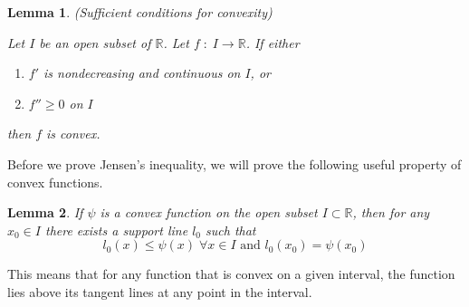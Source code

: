 \documentclass{article}
\newtheorem*{lemma}{Lemma}
\begin{document}
\begin{lemma} (Sufficient conditions for convexity)

Let $I$ be an open subset of $\mathbb{R}$. Let $f\;:\;I\rightarrow \mathbb{R}$.
If either
\begin{enumerate}
    \item $f'$ is nondecreasing and continuous on $I$, or
    \item $f'' \geq 0$ on $I$
\end{enumerate}
then $f$ is convex.
\end{lemma}

Before we prove Jensen's inequality, we will prove the following useful property
of convex functions.

\begin{lemma}
    If $\psi$ is a convex function on the open subset $I \subset \mathbb{R}$,
    then for any $x_0 \in I$ there exists a support line $l_0$ such that
    $$l_0(x) \leq \psi(x)\;\forall x \in I\text{ and } l_0 (x_0) = \psi(x_0)$$
\end{lemma}

This means that for any function that is convex on a given interval, the
function lies above its tangent lines at any point in the interval.
\end{document}
